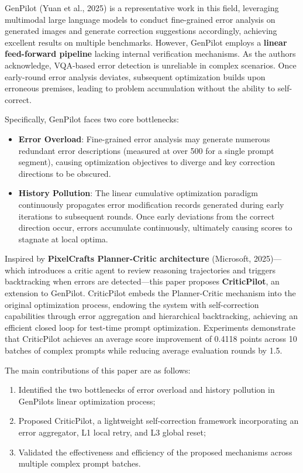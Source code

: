 \documentclass[
]{article}
\begin{document}
GenPilot (Yuan et al., 2025) is a representative work in this field,
leveraging multimodal large language models to conduct fine-grained
error analysis on generated images and generate correction suggestions
accordingly, achieving excellent results on multiple benchmarks.
However, GenPilot employs a \textbf{linear feed-forward pipeline}
lacking internal verification mechanisms. As the authors acknowledge,
VQA-based error detection is unreliable in complex scenarios. Once
early-round error analysis deviates, subsequent optimization builds upon
erroneous premises, leading to problem accumulation without the ability
to self-correct.

Specifically, GenPilot faces two core bottlenecks:

\begin{itemize}
\item
  \textbf{Error Overload}: Fine-grained error analysis may generate
  numerous redundant error descriptions (measured at over 500 for a
  single prompt segment), causing optimization objectives to diverge and
  key correction directions to be obscured.
\item
  \textbf{History Pollution}: The linear cumulative optimization
  paradigm continuously propagates error modification records generated
  during early iterations to subsequent rounds. Once early deviations
  from the correct direction occur, errors accumulate continuously,
  ultimately causing scores to stagnate at local optima.
\end{itemize}

Inspired by \textbf{PixelCraft\textquotesingle s Planner-Critic
architecture} (Microsoft, 2025)---which introduces a critic agent to
review reasoning trajectories and triggers backtracking when errors are
detected---this paper proposes \textbf{CriticPilot}, an extension to
GenPilot. CriticPilot embeds the Planner-Critic mechanism into the
original optimization process, endowing the system with self-correction
capabilities through error aggregation and hierarchical backtracking,
achieving an efficient closed loop for test-time prompt optimization.
Experiments demonstrate that CriticPilot achieves an average score
improvement of 0.4118 points across 10 batches of complex prompts while
reducing average evaluation rounds by 1.5.

The main contributions of this paper are as follows:

\begin{enumerate}
\def\labelenumi{\arabic{enumi}.}
\item
  Identified the two bottlenecks of error overload and history pollution
  in GenPilot\textquotesingle s linear optimization process;
\item
  Proposed CriticPilot, a lightweight self-correction framework
  incorporating an error aggregator, L1 local retry, and L3 global
  reset;
\item
  Validated the effectiveness and efficiency of the proposed mechanisms
  across multiple complex prompt batches.
\end{enumerate}
\end{document}
